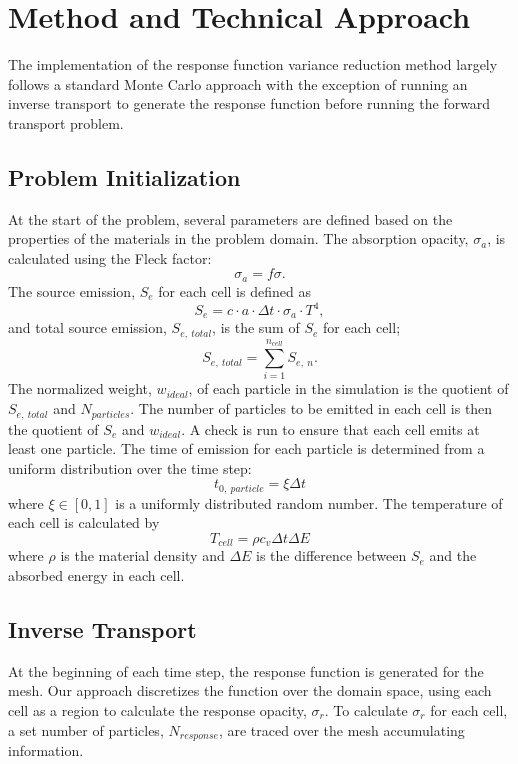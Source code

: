 \section{Method and Technical Approach}
The implementation of the response function variance reduction method largely follows a standard Monte Carlo approach with the exception of running an inverse transport to generate the response function before running the forward transport problem. 

\subsection{Problem Initialization}	
At the start of the problem, several parameters are defined based on the properties of the materials in the problem domain. The absorption opacity, $\sigma_{a}$, is calculated using the Fleck factor:
\begin{equation}
\sigma_{a} = f \sigma.
\end{equation}The source emission, $S_{e}$ for each cell is defined as
\begin{equation}
S_{e} = c \cdot a \cdot \Delta t \cdot \sigma_{a}  \cdot T^{4},
\end{equation}
and total source emission, $S_{e,~total}$, is the sum of $S_{e}$ for each cell;
\begin{equation}
S_{e,~total} = \sum_{i = 1}^{n_{cell}} S_{e,~n}.
\end{equation}
The normalized weight, $w_{ideal}$, of each particle in the simulation is the quotient of $S_{e,~total}$ and $N_{particles}$. The number of particles to be emitted in each cell is then the quotient of $S_{e}$ and $w_{ideal}$. A check is run to ensure that each cell emits at least one particle. The time of emission for each particle is determined from a uniform distribution over the time step:
\begin{equation}
t_{0,~particle} = \xi \Delta t
\end{equation}
where $\xi \in [0,1]$ is a uniformly distributed random number. The temperature of each cell is calculated by
\begin{equation} \label{Eq: cell_T}
T_{cell} = \rho c_{v} \Delta t \Delta E
\end{equation}
where $\rho$ is the material density and $\Delta E$ is the difference between $S_{e}$ and the absorbed energy in each cell.

\subsection{Inverse Transport}
At the beginning of each time step, the response function is generated for the mesh. Our approach discretizes the function over the domain space, using each cell as a region to calculate the response opacity, $\sigma_{r}$. To calculate $\sigma_{r}$ for each cell, a set number of particles, $N_{response}$, are traced over the mesh accumulating information. 

